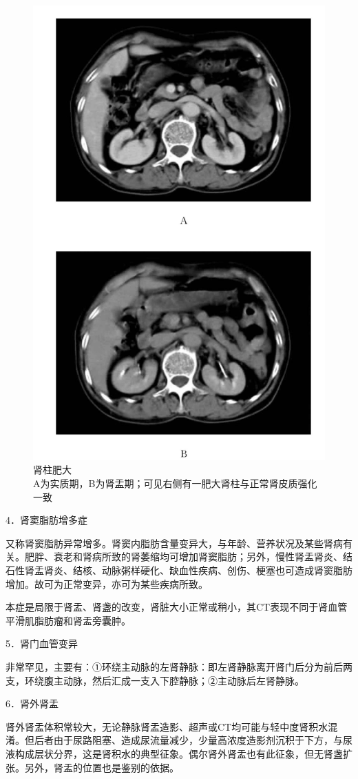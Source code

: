 \begin{figure}[!htbp]
 \centering
 \includegraphics[width=.7\textwidth,height=\textheight,keepaspectratio]{./images/Image00318.jpg}
 \captionsetup{justification=centering}
 \caption{肾柱肥大\\{\small A为实质期，B为肾盂期；可见右侧有一肥大肾柱与正常肾皮质强化一致}}
 \label{fig15-3}
  \end{figure} 

4．肾窦脂肪增多症

又称肾窦脂肪异常增多。肾窦内脂肪含量变异大，与年龄、营养状况及某些肾病有关。肥胖、衰老和肾病所致的肾萎缩均可增加肾窦脂肪；另外，慢性肾盂肾炎、结石性肾盂肾炎、结核、动脉粥样硬化、缺血性疾病、创伤、梗塞也可造成肾窦脂肪增加。故可为正常变异，亦可为某些疾病所致。

本症是局限于肾盂、肾盏的改变，肾脏大小正常或稍小，其CT表现不同于肾血管平滑肌脂肪瘤和肾盂旁囊肿。

5．肾门血管变异

非常罕见，主要有：①环绕主动脉的左肾静脉：即左肾静脉离开肾门后分为前后两支，环绕腹主动脉，然后汇成一支入下腔静脉；②主动脉后左肾静脉。

6．肾外肾盂

肾外肾盂体积常较大，无论静脉肾盂造影、超声或CT均可能与轻中度肾积水混淆。但后者由于尿路阻塞、造成尿流量减少，少量高浓度造影剂沉积于下方，与尿液构成层状分界，这是肾积水的典型征象。偶尔肾外肾盂也有此征象，但无肾盏扩张。另外，肾盂的位置也是鉴别的依据。

